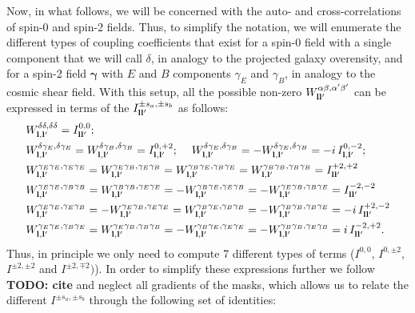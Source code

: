 \documentclass[a4paper,11pt]{article}
\newcommand{\todo}[1]{{\bf TODO: #1}}
\begin{document}
      Now, in what follows, we will be concerned with the auto- and cross-correlations of spin-0 and spin-2 fields. Thus, to simplify the notation, we will enumerate the different types of coupling coefficients that exist for a spin-0 field with a single component that we will call $\delta$, in analogy to the projected galaxy overensity, and for a spin-2 field $\mathbf{\gamma}$ with $E$ and $B$ components $\gamma_E$ and $\gamma_B$, in analogy to the cosmic shear field. With this setup, all the possible non-zero $W^{\alpha\beta,\alpha'\beta'}_{{\bf l}{\bf l}'}$ can be expressed in terms of the $I^{\pm s_a,\pm s_b}_{{\bf l}{\bf l}'}$ as follows:
      \begin{align}\label{eq:coeff}
        &W^{\delta\delta,\delta\delta}_{{\bf l},{\bf l}'}=I^{0,0}_{{\bf l}{\bf l}'}; \\
        &W^{\delta\gamma_E,\delta\gamma_E}_{{\bf l},{\bf l}'}=W^{\delta\gamma_B,\delta\gamma_B}_{{\bf l},{\bf l}'}=I^{0,+2}_{{\bf l},{\bf l}'};\hspace{12pt}
        W^{\delta\gamma_E,\delta\gamma_B}_{{\bf l},{\bf l}'}=-W^{\delta\gamma_E,\delta\gamma_B}_{{\bf l},{\bf l}'}=-i\,I^{0,-2}_{{\bf l},{\bf l}'};\\
        &W^{\gamma_E\gamma_E,\gamma_E\gamma_E}_{{\bf l},{\bf l}'}=W^{\gamma_E\gamma_B,\gamma_E\gamma_B}_{{\bf l},{\bf l}'}=W^{\gamma_B\gamma_E,\gamma_B\gamma_E}_{{\bf l},{\bf l}'}=W^{\gamma_B\gamma_B,\gamma_B\gamma_B}_{{\bf l},{\bf l}'}=I^{+2,+2}_{{\bf l}{\bf l}'}\\
        &W^{\gamma_E\gamma_E,\gamma_B\gamma_B}_{{\bf l},{\bf l}'}=W^{\gamma_B\gamma_B,\gamma_E\gamma_E}_{{\bf l},{\bf l}'}=-W^{\gamma_B\gamma_E,\gamma_E\gamma_B}_{{\bf l},{\bf l}'}=-W^{\gamma_E\gamma_B,\gamma_B\gamma_E}_{{\bf l},{\bf l}'}=I^{-2,-2}_{{\bf l}{\bf l}'}\\
        &W^{\gamma_E\gamma_E,\gamma_E\gamma_B}_{{\bf l},{\bf l}'}=-W^{\gamma_E\gamma_B,\gamma_E\gamma_E}_{{\bf l},{\bf l}'}=W^{\gamma_B\gamma_E,\gamma_B\gamma_B}_{{\bf l},{\bf l}'}=-W^{\gamma_B\gamma_B,\gamma_B\gamma_E}_{{\bf l},{\bf l}'}=-i\,I^{+2,-2}_{{\bf l}{\bf l}'}\\
        &W^{\gamma_E\gamma_E,\gamma_B\gamma_E}_{{\bf l},{\bf l}'}=W^{\gamma_E\gamma_B,\gamma_B\gamma_B}_{{\bf l},{\bf l}'}=-W^{\gamma_B\gamma_E,\gamma_E\gamma_E}_{{\bf l},{\bf l}'}=-W^{\gamma_B\gamma_B,\gamma_E\gamma_B}_{{\bf l},{\bf l}'}=i\,I^{-2,+2}_{{\bf l}{\bf l}'}.
      \end{align}
      Thus, in principle we only need to compute 7 different types of terms ($I^{0,0}$, $I^{0,\pm2}$, $I^{\pm2,\pm2}$ and $I^{\pm2,\mp2})$). In order to simplify these expressions further we follow \todo{cite} and neglect all gradients of the masks, which allows us to relate the different $I^{\pm s_a,\pm s_b}$ through the following set of identities:
\end{document}
